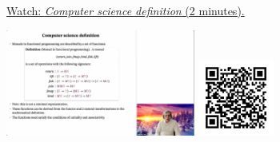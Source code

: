 
\begin{minipage}{10cm}
    \href{https://act4e-spring21.netlify.app/videos/spring2021-monads-a:monad-cs.html}{Watch: \emph{Computer science definition} (2 minutes).}
        
    \href{https://act4e-spring21.netlify.app/videos/spring2021-monads-a:monad-cs.html}{\includegraphics[height=3.5cm]{spring2021-monads-a:monad-cs/thumbnails.jpg}}
    \href{https://act4e-spring21.netlify.app/videos/spring2021-monads-a:monad-cs.html}{\includegraphics[height=2.5cm]{spring2021-monads-a:monad-cs/qrcode.png}}
\end{minipage}
